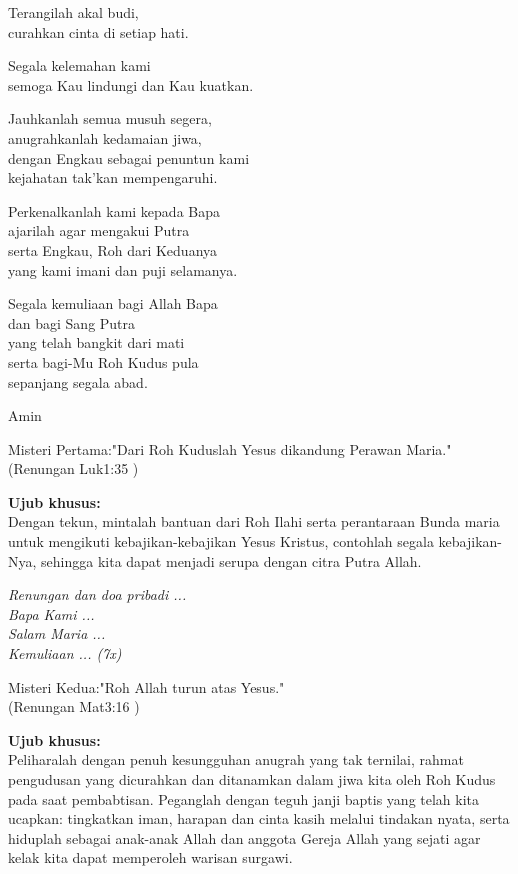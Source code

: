 \documentclass[a5paper,titlepage,11pt]{book}
\begin{document}
Terangilah akal budi,\\
curahkan cinta di setiap hati.

Segala kelemahan kami\\
semoga Kau lindungi dan Kau kuatkan.

Jauhkanlah semua musuh segera,\\
anugrahkanlah kedamaian jiwa,\\
dengan Engkau sebagai penuntun kami\\
kejahatan tak'kan mempengaruhi.

Perkenalkanlah kami kepada Bapa\\
ajarilah agar mengakui Putra\\
serta Engkau, Roh dari Keduanya\\
yang kami imani dan puji selamanya.

Segala kemuliaan bagi Allah Bapa\\
dan bagi Sang Putra\\
yang telah bangkit dari mati\\
serta bagi-Mu Roh Kudus pula\\
sepanjang segala abad.

Amin

Misteri Pertama:"Dari Roh Kuduslah Yesus dikandung Perawan Maria."\\
(Renungan Luk1:35 )

{\bf Ujub khusus:}\\
Dengan tekun, mintalah bantuan dari Roh Ilahi serta perantaraan Bunda maria untuk mengikuti kebajikan-kebajikan Yesus Kristus, contohlah segala kebajikan-Nya, sehingga kita dapat menjadi serupa dengan citra Putra Allah.

{\it Renungan dan doa pribadi ...\\
Bapa Kami ...\\
Salam Maria ...\\
Kemuliaan ... (7x)}

Misteri Kedua:"Roh Allah turun atas Yesus."\\
(Renungan Mat3:16 )

{\bf Ujub khusus:}\\
Peliharalah dengan penuh kesungguhan anugrah yang tak ternilai, rahmat pengudusan yang dicurahkan dan ditanamkan dalam jiwa kita oleh Roh Kudus pada saat pembabtisan. Peganglah dengan teguh janji baptis yang telah kita ucapkan: tingkatkan iman, harapan dan cinta kasih melalui tindakan nyata, serta hiduplah sebagai anak-anak Allah dan anggota Gereja Allah yang sejati agar kelak kita dapat memperoleh warisan surgawi.
\end{document}
